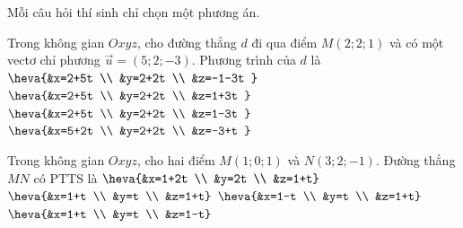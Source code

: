 %

\TN
Mỗi câu hỏi thí sinh chỉ chọn một phương án.
\begin{ex}%
	Trong không gian $Oxyz$, cho đường thẳng $d$ đi qua điểm $M(2; 2; 1)$ và có một vectơ chỉ phương $\overrightarrow{u}=(5; 2;-3)$. Phương trình của $d$ là
	\choice
	{$\heva{&x=2+5t \\
			&y=2+2t \\
			&z=-1-3t
		}$}
	{$\heva{&x=2+5t \\
			&y=2+2t \\
			&z=1+3t
		}$}
	{\True $\heva{&x=2+5t \\
			&y=2+2t \\
			&z=1-3t
		}$}
	{$\heva{&x=5+2t \\
			&y=2+2t \\
			&z=-3+t
		}$}
\end{ex}
\begin{ex}%
	Trong không gian $Oxyz$, cho hai điểm $M(1; 0; 1)$ và $N(3; 2;-1)$. Đường thẳng $MN$ có PTTS là
	\choice
	{$\heva{&x=1+2t \\
			&y=2t \\
			&z=1+t}$}
	{$\heva{&x=1+t \\
			&y=t \\
			&z=1+t}$}
	{$\heva{&x=1-t \\
			&y=t \\
			&z=1+t}$}
	{\True $\heva{&x=1+t \\
			&y=t \\
			&z=1-t}$}
\end{ex}
